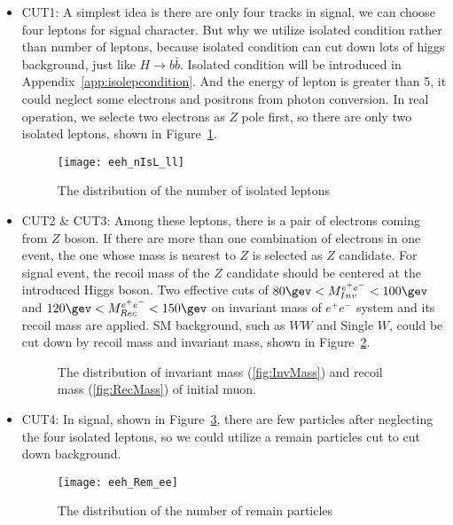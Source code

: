 \documentclass[11pt,a4paper]{cepcnote}
\begin{document}
\begin{itemize}   

\item  CUT1: A simplest idea is there are only four tracks in signal, we can choose four leptons for signal character. 
But why we utilize isolated condition rather than number of leptons, 
because isolated condition can cut down lots of higgs background, just like $H\rightarrow b\bar{b}$. 
Isolated condition will be introduced in Appendix~\ref{app:isolepcondition}. 
And the energy of lepton is greater than 5\gev, it could neglect some electrons and positrons from photon conversion.
In real operation, we selecte two electrons as $Z$ pole first, so there are only two isolated leptons, 
shown in Figure~\ref{fig:nIsL}.
\begin{figure}[H]
  \centering
  \texttt{[image: eeh\_nIsL\_ll]}
  \caption[NO. Isolated Leptons]{The distribution of the number of isolated leptons}
  \label{fig:nIsL}
\end{figure}

\item CUT2 \& CUT3: Among these leptons, there is a pair of electrons coming from $Z$ boson. 
If there are more than one combination of electrons in one event, 
the one whose mass is nearest to $Z$ is selected as $Z$ candidate. 
For signal event, the recoil mass of the $Z$ candidate should be centered at the introduced Higgs boson. 
Two effective cuts of $80\gev < M^{e^+e^-}_{Inv} < 100\gev$ and $120\gev< M^{e^+e^-}_{Rec} < 150\gev$ 
on invariant mass of $e^+e^-$ system and its recoil mass are applied. 
SM background, such as $WW$ and Single $W$, could be cut down by recoil mass and invariant mass, 
shown in Figure~\ref{fig:invandrec}.\\
\begin{figure}[H]
  \centering
  \caption[]{The distribution of invariant mass (\ref{fig:InvMass}) and recoil mass (\ref{fig:RecMass}) of initial muon.}
  \label{fig:invandrec}
\end{figure}

\item  CUT4: In signal, shown in Figure~\ref{fig:nRem}, 
there are few particles after neglecting the four isolated leptons, 
so we could utilize a remain particles cut to cut down background.\\
\begin{figure}[H]
  \centering
  \texttt{[image: eeh\_Rem\_ee]}
  \caption[NO. Remain Particles]{The distribution of the number of remain particles}
  \label{fig:nRem}
\end{figure}


\end{itemize}
\end{document}
